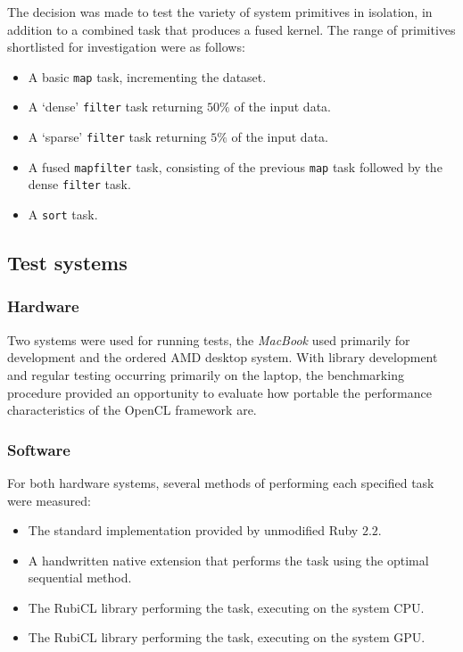 The decision was made to test the variety of system primitives in isolation, in addition to a combined task that produces a fused kernel.
The range of primitives shortlisted for investigation were as follows:
\begin{itemize}
  \item A basic \verb|map| task, incrementing the dataset.
  \item A `dense' \verb|filter| task returning $50\%$ of the input data.
  \item A `sparse' \verb|filter| task returning $5\%$ of the input data.
  \item A fused \verb|mapfilter| task, consisting of the previous \verb|map| task followed by the dense \verb|filter| task.
  \item A \verb|sort| task.
\end{itemize}

\subsection{Test systems}
\subsubsection{Hardware}
Two systems were used for running tests, the \emph{MacBook} used primarily for development and the ordered \ac{AMD} desktop system.
With library development and regular testing occurring primarily on the laptop, the benchmarking procedure provided an opportunity to evaluate how portable the performance characteristics of the \ac{OpenCL} framework are.

\subsubsection{Software}
For both hardware systems, several methods of performing each specified task were measured:
\begin{itemize}
    \item The standard implementation provided by unmodified Ruby $2.2$.
    \item A handwritten native extension that performs the task using the optimal sequential method.
    \item The RubiCL library performing the task, executing on the system \ac{CPU}.
    \item The RubiCL library performing the task, executing on the system \ac{GPU}.
\end{itemize}

